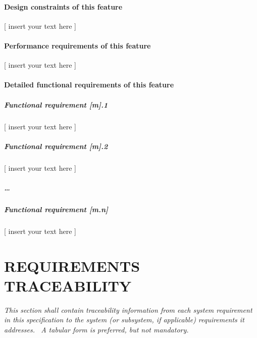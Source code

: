 \documentclass[twoside,letterpaper]{article}
\begin{document}
\paragraph[Design constraints of this
feature]{\rmfamily\bfseries\color{black} Design
constraints of this feature}
{\color{black}
[ insert your text here ]}

\paragraph[Performance requirements of this
feature]{\rmfamily\bfseries\color{black}
Performance requirements of this feature}
{\color{black}
[ insert your text here ]}

\paragraph[Detailed functional requirements of this
feature]{\rmfamily\bfseries\color{black}
Detailed functional requirements of this feature}
\subparagraph{Functional requirement [m].1}
{\color{black}
[ insert your text here ]}

\subparagraph[Functional requirement [m{]}.2]{Functional requirement
[m].2}
{\color{black}
[ insert your text here ]}

\subparagraph{{\dots}}
\subparagraph{Functional requirement [m.n]}
{\color{black}
[ insert your text here ]}

\clearpage\setcounter{page}{1}\pagestyle{Convertvi}
\section[REQUIREMENTS
TRACEABILITY]{\rmfamily\bfseries\color{black}
REQUIREMENTS TRACEABILITY}
{\itshape\color{black}
This section shall contain traceability information from each system
requirement in this specification to the system (or subsystem, if
applicable) requirements it addresses. \ A tabular form is preferred,
but not mandatory.}


\bigskip
\end{document}
